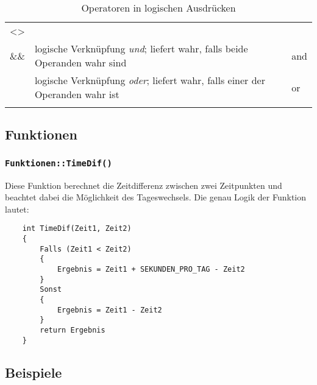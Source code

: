 \begin{longtable}[c]{@{}lll@{}}
\begin{minipage}[t]{0.15\columnwidth}
\textless{}\textgreater{}
\end{minipage}
\\\noalign{\medskip}
\begin{minipage}[t]{0.08\columnwidth}\raggedright
\&\&
\end{minipage} & \begin{minipage}[t]{0.77\columnwidth}\raggedright
logische Verknüpfung \emph{und}; liefert wahr, falls beide Operanden
wahr sind
\end{minipage} & \begin{minipage}[t]{0.15\columnwidth}\raggedright
and
\end{minipage}
\\\noalign{\medskip}
\begin{minipage}[t]{0.08\columnwidth}\raggedright
\textbar{}\textbar{}
\end{minipage} & \begin{minipage}[t]{0.77\columnwidth}\raggedright
logische Verknüpfung \emph{oder}; liefert wahr, falls einer der
Operanden wahr ist
\end{minipage} & \begin{minipage}[t]{0.15\columnwidth}\raggedright
or
\end{minipage}
\\\noalign{\medskip}
\hline
\noalign{\medskip}
\caption{Operatoren in logischen Ausdrücken}
\end{longtable}

\subsection{Funktionen}

\subsubsection{\texttt{Funktionen::TimeDif()}}

Diese Funktion berechnet die Zeitdifferenz zwischen zwei Zeitpunkten und
beachtet dabei die Möglichkeit des Tageswechsels. Die genau Logik der
Funktion lautet:

\begin{lstlisting}
    int TimeDif(Zeit1, Zeit2)
    {
        Falls (Zeit1 < Zeit2)
        {
            Ergebnis = Zeit1 + SEKUNDEN_PRO_TAG - Zeit2
        }
        Sonst
		{
			Ergebnis = Zeit1 - Zeit2
		}
        return Ergebnis
    }       
\end{lstlisting}

\subsection{Beispiele}

